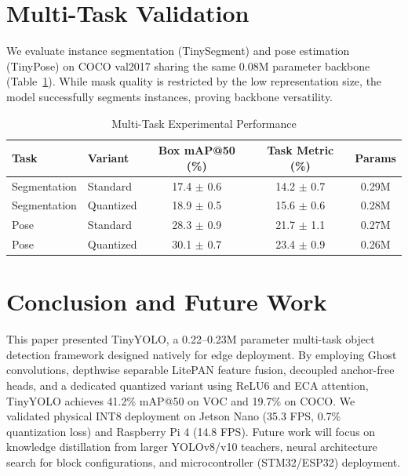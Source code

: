 \documentclass[journal]{IEEEtran}
\begin{document}
\section{Multi-Task Validation}
We evaluate instance segmentation (TinySegment) and pose estimation (TinyPose) on COCO val2017 sharing the same 0.08M parameter backbone (Table~\ref{tab:multi_task_results}). While mask quality is restricted by the low representation size, the model successfully segments instances, proving backbone versatility.

\begin{table}[h]
\centering
\caption{Multi-Task Experimental Performance}
\label{tab:multi_task_results}
\setlength{\tabcolsep}{4pt}
\begin{tabular}{llccc}
\toprule
Task & Variant & Box mAP@50 (\%) & Task Metric (\%) & Params \\
\midrule
Segmentation & Standard & 17.4 $\pm$ 0.6 & 14.2 $\pm$ 0.7 & 0.29M \\
Segmentation & Quantized & 18.9 $\pm$ 0.5 & 15.6 $\pm$ 0.6 & 0.28M \\
Pose & Standard & 28.3 $\pm$ 0.9 & 21.7 $\pm$ 1.1 & 0.27M \\
Pose & Quantized & 30.1 $\pm$ 0.7 & 23.4 $\pm$ 0.9 & 0.26M \\
\bottomrule
\end{tabular}
\end{table}

\section{Conclusion and Future Work}
This paper presented TinyYOLO, a 0.22--0.23M parameter multi-task object detection framework designed natively for edge deployment. By employing Ghost convolutions, depthwise separable LitePAN feature fusion, decoupled anchor-free heads, and a dedicated quantized variant using ReLU6 and ECA attention, TinyYOLO achieves 41.2\% mAP@50 on VOC and 19.7\% on COCO. We validated physical INT8 deployment on Jetson Nano (35.3 FPS, 0.7\% quantization loss) and Raspberry Pi 4 (14.8 FPS). Future work will focus on knowledge distillation from larger YOLOv8/v10 teachers, neural architecture search for block configurations, and microcontroller (STM32/ESP32) deployment.



\end{document}
